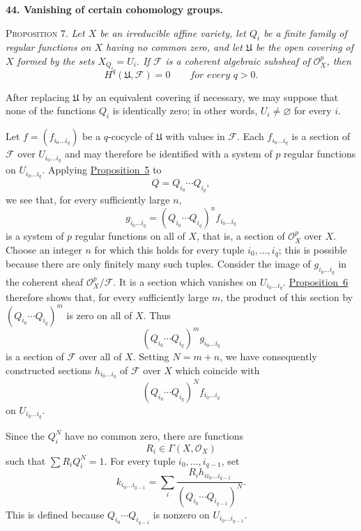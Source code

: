 
\medskip
{}\label{fac:II:3:no:44}
\textbf{44. Vanishing of certain cohomology groups.}

\label{fac:II:3:no:44:prop:7}
\textsc{Proposition 7.} \textit{Let $X$ be an irreducible affine variety, let $Q_i$ be a finite family of regular functions on $X$ having no common zero, and let $\mathfrak{U}$ be the open covering of $X$ formed by the sets $X_{Q_i}=U_i$. If $\mathcal{F}$ is a coherent algebraic subsheaf of $\mathcal{O}_X^p$, then}
\[
H^q(\mathfrak{U},\mathcal{F})=0
\qquad\textit{for every $q>0$.}
\]

After replacing $\mathfrak{U}$ by an equivalent covering if necessary, we may suppose that none of the functions $Q_i$ is identically zero; in other words, $U_i\neq\varnothing$ for every $i$.

Let $f=(f_{i_0\ldots i_q})$ be a $q$-cocycle of $\mathfrak{U}$ with values in $\mathcal{F}$. Each $f_{i_0\ldots i_q}$ is a section of $\mathcal{F}$ over $U_{i_0\ldots i_q}$ and may therefore be identified with a system of $p$ regular functions on $U_{i_0\ldots i_q}$. Applying \hyperref[fac:II:3:no:43:prop:5]{Proposition~5} to
\[
Q=Q_{i_0}\cdots Q_{i_q},
\]
we see that, for every sufficiently large $n$,
\[
g_{i_0\ldots i_q}
=(Q_{i_0}\cdots Q_{i_q})^n f_{i_0\ldots i_q}
\]
is a system of $p$ regular functions on all of $X$, that is, a section of $\mathcal{O}_X^p$ over $X$. Choose an integer $n$ for which this holds for every tuple $i_0,\ldots,i_q$; this is possible because there are only finitely many such tuples. Consider the image of $g_{i_0\ldots i_q}$ in the coherent sheaf $\mathcal{O}_X^p/\mathcal{F}$. It is a section which vanishes on $U_{i_0\ldots i_q}$. \hyperref[fac:II:3:no:43:prop:6]{Proposition~6} therefore shows that, for every sufficiently large $m$, the product of this section by $(Q_{i_0}\cdots Q_{i_q})^m$ is zero on all of $X$. Thus
\[
(Q_{i_0}\cdots Q_{i_q})^m g_{i_0\ldots i_q}
\]
is a section of $\mathcal{F}$ over all of $X$. Setting $N=m+n$, we have consequently constructed sections $h_{i_0\ldots i_q}$ of $\mathcal{F}$ over $X$ which coincide with
\[
(Q_{i_0}\cdots Q_{i_q})^N f_{i_0\ldots i_q}
\]
on $U_{i_0\ldots i_q}$.

Since the $Q_i^N$ have no common zero, there are functions
\[
R_i\in\Gamma(X,\mathcal{O}_X)
\]
such that $\sum R_iQ_i^N=1$. For every tuple $i_0,\ldots,i_{q-1}$, set
\[
k_{i_0\ldots i_{q-1}}
=\sum_i
\frac{R_i h_{i i_0\ldots i_{q-1}}}
{(Q_{i_0}\cdots Q_{i_{q-1}})^N}.
\]
This is defined because $Q_{i_0}\cdots Q_{i_{q-1}}$ is nonzero on $U_{i_0\ldots i_{q-1}}$.

